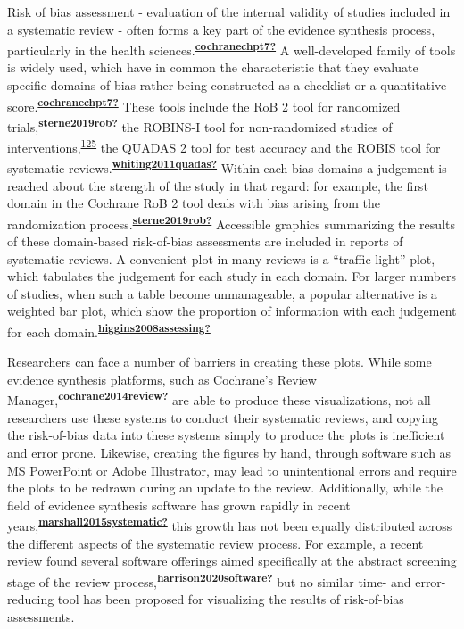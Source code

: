 \documentclass[a4paper, twoside]{templates/ociamthesis}
\begin{document}
Risk of bias assessment - evaluation of the internal validity of studies included in a systematic review - often forms a key part of the evidence synthesis process, particularly in the health sciences.\textsuperscript{\protect\hyperlink{ref-cochranechpt7}{\textbf{cochranechpt7?}}} A well-developed family of tools is widely used, which have in common the characteristic that they evaluate specific domains of bias rather being constructed as a checklist or a quantitative score.\textsuperscript{\protect\hyperlink{ref-cochranechpt7}{\textbf{cochranechpt7?}}} These tools include the RoB 2 tool for randomized trials,\textsuperscript{\protect\hyperlink{ref-sterne2019rob}{\textbf{sterne2019rob?}}} the ROBINS-I tool for non-randomized studies of interventions,\textsuperscript{\protect\hyperlink{ref-sterne2016}{125}} the QUADAS 2 tool for test accuracy and the ROBIS tool for systematic reviews.\textsuperscript{\protect\hyperlink{ref-whiting2011quadas}{\textbf{whiting2011quadas?}}} Within each bias domains a judgement is reached about the strength of the study in that regard: for example, the first domain in the Cochrane RoB 2 tool deals with bias arising from the randomization process.\textsuperscript{\protect\hyperlink{ref-sterne2019rob}{\textbf{sterne2019rob?}}} Accessible graphics summarizing the results of these domain-based risk-of-bias assessments are included in reports of systematic reviews. A convenient plot in many reviews is a ``traffic light'' plot, which tabulates the judgement for each study in each domain. For larger numbers of studies, when such a table become unmanageable, a popular alternative is a weighted bar plot, which show the proportion of information with each judgement for each domain.\textsuperscript{\protect\hyperlink{ref-higgins2008assessing}{\textbf{higgins2008assessing?}}}

Researchers can face a number of barriers in creating these plots. While some evidence synthesis platforms, such as Cochrane's Review Manager,\textsuperscript{\protect\hyperlink{ref-cochrane2014review}{\textbf{cochrane2014review?}}} are able to produce these visualizations, not all researchers use these systems to conduct their systematic reviews, and copying the risk-of-bias data into these systems simply to produce the plots is inefficient and error prone. Likewise, creating the figures by hand, through software such as MS PowerPoint or Adobe Illustrator, may lead to unintentional errors and require the plots to be redrawn during an update to the review. Additionally, while the field of evidence synthesis software has grown rapidly in recent years,\textsuperscript{\protect\hyperlink{ref-marshall2015systematic}{\textbf{marshall2015systematic?}}} this growth has not been equally distributed across the different aspects of the systematic review process. For example, a recent review found several software offerings aimed specifically at the abstract screening stage of the review process,\textsuperscript{\protect\hyperlink{ref-harrison2020software}{\textbf{harrison2020software?}}} but no similar time- and error-reducing tool has been proposed for visualizing the results of risk-of-bias assessments.
\end{document}

